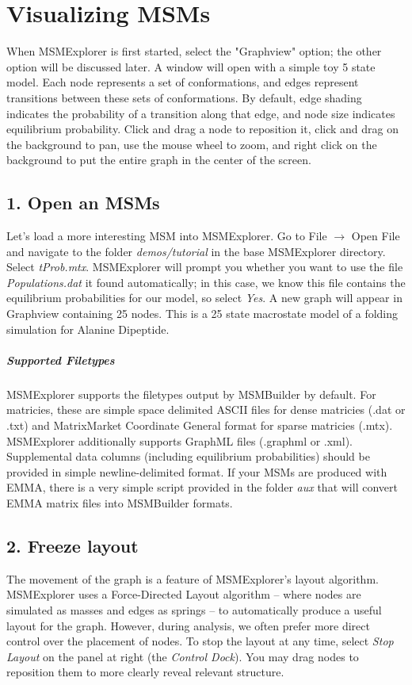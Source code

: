 \documentclass[10pt,a4paper]{report}
\begin{document}
\section*{Visualizing MSMs}
When MSMExplorer is first started, select the "Graphview" option; the other option will be discussed later. A window will open with a simple toy 5 state model. Each node represents a set of conformations, and edges represent transitions between these sets of conformations. By default, edge shading indicates the probability of a transition along that edge, and node size indicates equilibrium probability. Click and drag a node to reposition it, click and drag on the background to pan, use the mouse wheel to zoom, and right click on the background to put the entire graph in the center of the screen.
\subsection*{1. Open an MSMs}
Let's load a more interesting MSM into MSMExplorer. Go to File $\rightarrow$ Open File and navigate to the folder \emph{demos/tutorial} in the base MSMExplorer directory. Select \emph{tProb.mtx}. MSMExplorer will prompt you whether you want to use the file \emph{Populations.dat} it found automatically; in this case, we know this file contains the equilibrium probabilities for our model, so select \emph{Yes}. A new graph will appear in Graphview containing 25 nodes. This is a 25 state macrostate model of a folding simulation for Alanine Dipeptide.

\subparagraph*{Supported Filetypes}
MSMExplorer supports the filetypes output by MSMBuilder by default. For matricies, these are simple space delimited ASCII files for dense matricies (.dat or .txt) and MatrixMarket Coordinate General format for sparse matricies (.mtx). MSMExplorer additionally supports GraphML files (.graphml or .xml). Supplemental data columns (including equilibrium probabilities) should be provided in simple newline-delimited format. If your MSMs are produced with EMMA, there is a very simple script provided in the folder \emph{aux} that will convert EMMA matrix files into MSMBuilder formats.

\subsection*{2. Freeze layout}
The movement of the graph is a feature of MSMExplorer's layout algorithm. MSMExplorer uses a Force-Directed Layout algorithm -- where nodes are simulated as masses and edges as springs -- to automatically produce a useful layout for the graph. However, during analysis, we often prefer more direct control over the placement of nodes. To stop the layout at any time, select \emph{Stop Layout} on the panel at right (the \emph{Control Dock}). You may drag nodes to reposition them to more clearly reveal relevant structure.
\end{document}
